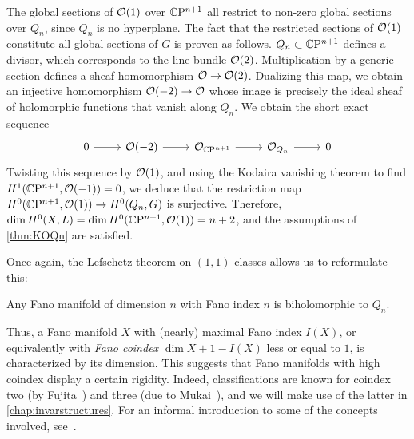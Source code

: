 \begin{myproof}
	The global sections of $\mathcal{O}(1)$ over $\mathbb{C}\mathrm{P}^{n+1}$ all restrict to non-zero global sections over $Q_n$, since $Q_n$ is no hyperplane. The fact that the restricted sections of $\mathcal{O}(1)$ constitute all global sections of $G$ is proven as follows. $Q_n\subset \mathbb{C}\mathrm{P}^{n+1}$ defines a divisor, which corresponds to the line bundle $\mathcal{O}(2)$. Multiplication by a generic section defines a sheaf homomorphism $\mathcal{O}\to \mathcal{O}(2)$. Dualizing this map, we obtain an injective homomorphism $\mathcal{O}(-2)\to \mathcal{O}$ whose image is precisely the ideal sheaf of holomorphic functions that vanish along $Q_n$. We obtain the short exact sequence
	\begin{equation*}
		\begin{tikzcd}
			0 \ar[r] & \mc O(-2) \ar[r] & \mc O_{\CP^{n+1}} \ar[r] & \mc O_{Q_n} \ar[r] & 0
		\end{tikzcd}
	\end{equation*}
	Twisting this sequence by $\mathcal{O}(1)$, and using the Kodaira vanishing theorem to find $H^1(\mathbb{C}\mathrm{P}^{n+1},\mathcal{O}(-1))=0$, we deduce that the restriction map $H^0(\mathbb{C}\mathrm{P}^{n+1},\mathcal{O}(1))\to H^0(Q_n,G)$ is surjective. Therefore, $\dim H^0(X,L)=\dim H^0(\mathbb{C}\mathrm{P}^{n+1},\mathcal{O}(1))=n+2$, and the assumptions of \cref{thm:KOQn} are satisfied.
\end{myproof}

Once again, the Lefschetz theorem on $(1,1)$-classes allows us to reformulate this:

\begin{cor}\label{cor:KOQn}
	Any Fano manifold of dimension $n$ with Fano index $n$ is biholomorphic to $Q_n$.\proofclear
\end{cor}

Thus, a Fano manifold $X$ with (nearly) maximal Fano index $I(X)$, or equivalently with \emph{Fano coindex} $\dim X+1-I(X)$ less or equal to $1$, is characterized by its dimension. This suggests that Fano manifolds with high coindex display a certain rigidity. Indeed, classifications are known for coindex two (by Fujita~\cite{Fuj1980}) and three (due to Mukai~\cite{Muk1989}), and we will make use of the latter in \cref{chap:invarstructures}. For an informal introduction to some of the concepts involved, see~\cite{Deb2013}.

